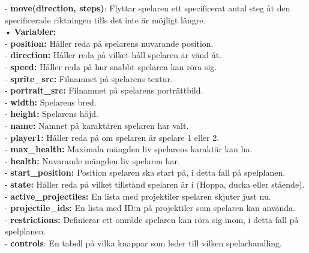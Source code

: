 \documentclass{TDP003mall}
\begin{document}
\indent- \textbf{move(direction, steps)}: Flyttar spelaren ett specificerat antal steg åt den specificerade riktningen tills det inte är möjligt längre. \\
• \textbf{Variabler:} \\
\indent- \textbf{position:} Håller reda på spelarens nuvarande position. \\
\indent- \textbf{direction:} Håller reda på vilket håll spelaren är vänd åt. \\
\indent- \textbf{speed:} Håller reda på hur snabbt spelaren kan röra sig. \\
\indent- \textbf{sprite\_src:} Filnamnet på spelarens textur. \\
\indent- \textbf{portrait\_src:} Filnamnet på spelarens porträttbild. \\
\indent- \textbf{width:} Spelarens bred. \\
\indent- \textbf{height:} Spelarens höjd. \\
\indent- \textbf{name:} Namnet på karaktären spelaren har valt. \\
\indent- \textbf{player1:} Håller reda på om spelaren är spelare 1 eller 2. \\
\indent- \textbf{max\_health:} Maximala mängden liv spelarens karaktär kan ha. \\
\indent- \textbf{health:} Nuvarande mängden liv spelaren har. \\
\indent- \textbf{start\_position:} Position spelaren ska start på, i detta fall på spelplanen. \\
\indent- \textbf{state:} Håller reda på vilket tillstånd spelaren är i (Hoppa, ducka eller stående). \\
\indent- \textbf{active\_projectiles:} En lista med projektiler spelaren skjuter just nu. \\
\indent- \textbf{projectile\_ids:} En lista med ID:n på projektiler som spelaren kan använda. \\
\indent- \textbf{restrictions:} Definierar ett område spelaren kan röra sig inom, i detta fall på spelplanen. \\
\indent- \textbf{controls}: En tabell på vilka knappar som leder till vilken spelarhandling. \\

\newpage
\end{document}

